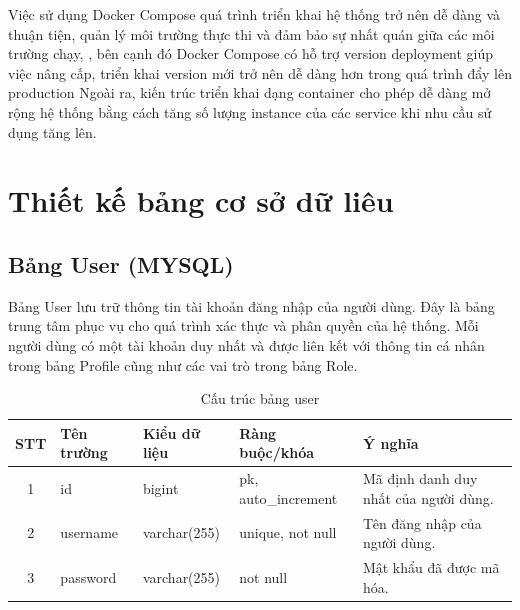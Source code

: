 \documentclass[../DoAn.tex]{subfiles}
\begin{document}
Việc sử dụng Docker Compose quá trình triển khai hệ thống trở nên dễ dàng và thuận tiện,
quản lý môi trường thực thi và đảm bảo sự nhất quán giữa các môi trường chạy, , bên cạnh đó Docker Compose có hỗ trợ version deployment giúp việc nâng cấp, triển khai version mới trở nên dễ dàng hơn trong quá trình đẩy lên production
Ngoài ra, kiến trúc triển khai dạng container cho phép dễ dàng mở rộng hệ thống
bằng cách tăng số lượng instance của các service khi nhu cầu sử dụng tăng lên.

\section{Thiết kế bảng cơ sở dữ liêu}
\subsection{Bảng User (MYSQL)}
Bảng User lưu trữ thông tin tài khoản đăng nhập của người dùng. Đây là bảng trung tâm phục vụ cho quá trình xác thực và phân quyền của hệ thống. Mỗi người dùng có một tài khoản duy nhất và được liên kết với thông tin cá nhân trong bảng Profile cũng như các vai trò trong bảng Role.
\begin{table}[htbp]
    \centering
    \small
    \renewcommand{\arraystretch}{1.3}
    \label{tab:user-structure}
    \begin{tabularx}{\textwidth}{|c|l|l|l|>{\raggedright\arraybackslash}X|}
        \hline
        \textbf{STT} & \textbf{Tên trường} & \textbf{Kiểu dữ liệu} & \textbf{Ràng buộc/khóa} & \textbf{Ý nghĩa}                      \\
        \hline
        1            & id                  & bigint                & pk, auto\_increment     & Mã định danh duy nhất của người dùng. \\
        \hline
        2            & username            & varchar(255)          & unique, not null        & Tên đăng nhập của người dùng.         \\
        \hline
        3            & password            & varchar(255)          & not null                & Mật khẩu đã được mã hóa.              \\
        \hline
    \end{tabularx}
    \caption{Cấu trúc bảng user}
\end{table}
\end{document}
